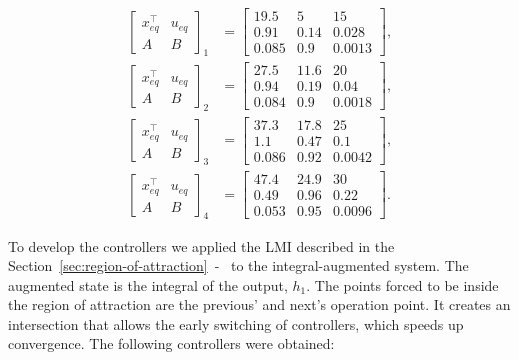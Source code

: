 \begin{align}
  \label{eq:op-points}
  \left[\begin{array}{c|c}
      x_{eq}^{\top} & u_{eq} \\
      \hline
      A             & B
    \end{array}\right]_{1} & = \left[\begin{array}{cc|c}
      19.5  & 5    & 15     \\
      \hline
      0.91  & 0.14 & 0.028  \\
      0.085 & 0.9  & 0.0013
    \end{array}\right], \\
  \left[\begin{array}{c|c}
      x_{eq}^{\top} & u_{eq} \\
      \hline
      A             & B
    \end{array}\right]_{2} & = \left[\begin{array}{cc|c}
      27.5  & 11.6 & 20     \\
      \hline
      0.94  & 0.19 & 0.04   \\
      0.084 & 0.9  & 0.0018
    \end{array}\right], \\
  \left[\begin{array}{c|c}
      x_{eq}^{\top} & u_{eq} \\
      \hline
      A             & B
    \end{array}\right]_{3} & = \left[\begin{array}{cc|c}
      37.3  & 17.8 & 25     \\
      \hline
      1.1   & 0.47 & 0.1    \\
      0.086 & 0.92 & 0.0042
    \end{array}\right], \\
  \left[\begin{array}{c|c}
      x_{eq}^{\top} & u_{eq} \\
      \hline
      A             & B
    \end{array}\right]_{4} & = \left[\begin{array}{cc|c}
      47.4  & 24.9 & 30     \\
      \hline
      0.49  & 0.96 & 0.22   \\
      0.053 & 0.95 & 0.0096
    \end{array}\right].
\end{align}

To develop the controllers we applied the LMI described in the
Section~\ref{sec:region-of-attraction}~-~ to
the integral-augmented system. The augmented state is the integral of the
output, \(h_{1}\). The points forced to be inside the region of attraction are
the previous' and next's operation point. It creates an intersection that allows
the early switching of controllers, which speeds up convergence. The following
controllers were obtained:

